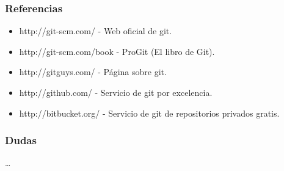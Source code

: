 \documentclass[10pt]{beamer}
\begin{document}
  \begin{frame}[containsverbatim]
    \frametitle{Referencias}
    \begin{itemize}
      \item \small{http://git-scm.com/ - Web oficial de git.}
      \item \small{http://git-scm.com/book - ProGit (El libro de Git).}
      \item \small{http://gitguys.com/ - Página sobre git.}
      \item \small{http://github.com/ - Servicio de git por excelencia.}
      \item \small{http://bitbucket.org/ - Servicio de git de repositorios privados gratis.}
    \end{itemize}
  \end{frame}

  \begin{frame}[containsverbatim]
    \frametitle{Dudas}
    \dots
  \end{frame}
\end{document}
